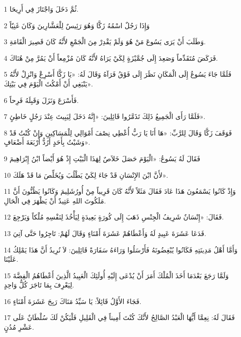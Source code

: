 \par 1 ثُمَّ دَخَلَ وَاجْتَازَ فِي أَرِيحَا.
\par 2 وَإِذَا رَجُلٌ اسْمُهُ زَكَّا وَهُوَ رَئِيسٌ لِلْعَشَّارِينَ وَكَانَ غَنِيّاً
\par 3 وَطَلَبَ أَنْ يَرَى يَسُوعَ مَنْ هُوَ وَلَمْ يَقْدِرْ مِنَ الْجَمْعِ لأَنَّهُ كَانَ قَصِيرَ الْقَامَةِ.
\par 4 فَرَكَضَ مُتَقَدِّماً وَصَعِدَ إِلَى جُمَّيْزَةٍ لِكَيْ يَرَاهُ لأَنَّهُ كَانَ مُزْمِعاً أَنْ يَمُرَّ مِنْ هُنَاكَ.
\par 5 فَلَمَّا جَاءَ يَسُوعُ إِلَى الْمَكَانِ نَظَرَ إِلَى فَوْقُ فَرَآهُ وَقَالَ لَهُ: «يَا زَكَّا أَسْرِعْ وَانْزِلْ لأَنَّهُ يَنْبَغِي أَنْ أَمْكُثَ الْيَوْمَ فِي بَيْتِكَ».
\par 6 فَأَسْرَعَ وَنَزَلَ وَقَبِلَهُ فَرِحاً.
\par 7 فَلَمَّا رَأَى الْجَمِيعُ ذَلِكَ تَذَمَّرُوا قَائِلِينَ: «إِنَّهُ دَخَلَ لِيَبِيتَ عِنْدَ رَجُلٍ خَاطِئٍ».
\par 8 فَوَقَفَ زَكَّا وَقَالَ لِلرَّبِّ: «هَا أَنَا يَا رَبُّ أُعْطِي نِصْفَ أَمْوَالِي لِلْمَسَاكِينِ وَإِنْ كُنْتُ قَدْ وَشَيْتُ بِأَحَدٍ أَرُدُّ أَرْبَعَةَ أَضْعَافٍ».
\par 9 فَقَالَ لَهُ يَسُوعُ: «الْيَوْمَ حَصَلَ خَلاَصٌ لِهَذَا الْبَيْتِ إِذْ هُوَ أَيْضاً ابْنُ إِبْرَاهِيمَ
\par 10 لأَنَّ ابْنَ الإِنْسَانِ قَدْ جَاءَ لِكَيْ يَطْلُبَ وَيُخَلِّصَ مَا قَدْ هَلَكَ».
\par 11 وَإِذْ كَانُوا يَسْمَعُونَ هَذَا عَادَ فَقَالَ مَثَلاً لأَنَّهُ كَانَ قَرِيباً مِنْ أُورُشَلِيمَ وَكَانُوا يَظُنُّونَ أَنَّ مَلَكُوتَ اللهِ عَتِيدٌ أَنْ يَظْهَرَ فِي الْحَالِ.
\par 12 فَقَالَ: «إِنْسَانٌ شَرِيفُ الْجِنْسِ ذَهَبَ إِلَى كُورَةٍ بَعِيدَةٍ لِيَأْخُذَ لِنَفْسِهِ مُلْكاً وَيَرْجِعَ.
\par 13 فَدَعَا عَشَرَةَ عَبِيدٍ لَهُ وَأَعْطَاهُمْ عَشَرَةَ أَمْنَاءٍ وَقَالَ لَهُمْ: تَاجِرُوا حَتَّى آتِيَ.
\par 14 وَأَمَّا أَهْلُ مَدِينَتِهِ فَكَانُوا يُبْغِضُونَهُ فَأَرْسَلُوا وَرَاءَهُ سَفَارَةً قَائِلِينَ: لاَ نُرِيدُ أَنَّ هَذَا يَمْلِكُ عَلَيْنَا.
\par 15 وَلَمَّا رَجَعَ بَعْدَمَا أَخَذَ الْمُلْكَ أَمَرَ أَنْ يُدْعَى إِلَيْهِ أُولَئِكَ الْعَبِيدُ الَّذِينَ أَعْطَاهُمُ الْفِضَّةَ لِيَعْرِفَ بِمَا تَاجَرَ كُلُّ وَاحِدٍ.
\par 16 فَجَاءَ الأَوَّلُ قَائِلاً: يَا سَيِّدُ مَنَاكَ رَبِحَ عَشَرَةَ أَمْنَاءٍ.
\par 17 فَقَالَ لَهُ: نِعِمَّا أَيُّهَا الْعَبْدُ الصَّالِحُ لأَنَّكَ كُنْتَ أَمِيناً فِي الْقَلِيلِ فَلْيَكُنْ لَكَ سُلْطَانٌ عَلَى عَشْرِ مُدُنٍ.

